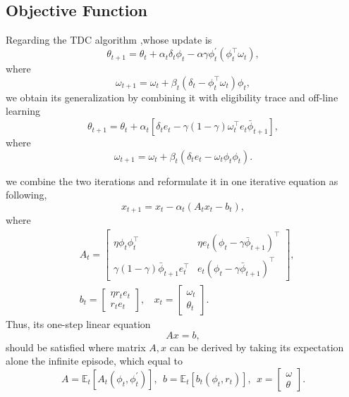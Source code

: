\documentclass[conference]{IEEEtran}
\begin{document}
\subsection{Objective Function}
Regarding the TDC algorithm \cite{sutton2009fast},whose update is
\begin{equation}
			\theta_{t+1} = \theta_{t}+\alpha_{t}\delta_t\phi_t -\alpha\gamma\phi_{t}^{'}(\phi_t^\top\omega_{t}),
\end{equation} 
where
\begin{equation} 
	\omega_{t+1}=\omega_{t}+\beta_{t}(\delta_{t}-\phi_{t}^\top\omega_{t})\phi_t,
\end{equation}
we obtain its generalization by combining it with eligibility trace and off-line learning
\begin{equation}
			\theta_{t+1} = \theta_{t}+\alpha_{t}[\delta_te_t -\gamma(1-\gamma)\omega_t^\top e_t\bar{\phi}_{t+1}],
\end{equation} 
where
\begin{equation} 
	\omega_{t+1}=\omega_{t}+\beta_{t}(\delta_{t}e_t-\omega_{t}\phi_{t}\phi_t).
\end{equation}

we combine the two iterations and reformulate it in one iterative equation as following,
\begin{equation}
	x_{t+1} = x_t-\alpha_t(A_tx_t-b_t),	
\end{equation}
where
\begin{equation}
\begin{split}
	&A_t = 	\begin{bmatrix} 
				\eta\phi_t\phi_t^\top & \eta e_t (\phi_t-\gamma\bar{\phi}_{t+1})^\top \\ 
				\gamma(1-\gamma)\bar{\phi}_{t+1}e_t^\top & e_t(\phi_t-\gamma\bar{\phi}_{t+1})^\top 
			\end{bmatrix},\\
	&b_t=\begin{bmatrix}\eta r_t e_t \\ r_te_t \end{bmatrix},\ \ \ \  x_t=\begin{bmatrix} \omega_t \\ \theta_t\end{bmatrix}.
\end{split}
\end{equation}
Thus, its one-step linear equation
\begin{equation}
	Ax = b,
\end{equation}
should be satisfied where matrix $A, x$ can be derived by taking its expectation alone the infinite episode, which equal to
\begin{equation}
	A = \mathbb{E}_t[A_t(\phi_t, \phi_t^{'})],\ \ b = \mathbb{E}_t[b_t(\phi_t, r_t)],\ \ x=\begin{bmatrix} \omega \\ \theta\end{bmatrix}.
\end{equation}
\end{document}
